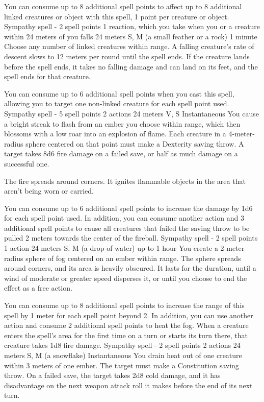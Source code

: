     You can consume up to 8 additional spell points to affect up to 8 additional linked creatures or object with this spell, 1 point per creature or object.
    {Sympathy spell - 2 spell points}
    {1 reaction, which you take when you or a creature within 24 meters of you falls}
    {24 meters}
    {S, M (a small feather or a rock)}
    {1 minute}
    Choose any number of linked creatures within range.
    A falling creature's rate of descent slows to 12 meters per round until the spell ends.
    If the creature lands before the spell ends, it takes no falling damage and can land on its feet, and the spell ends for that creature.

    You can consume up to 6 additional spell points when you cast this spell, allowing you to target one non-linked creature for each spell point used.
    {Sympathy spell - 5 spell points}
    {2 actions}
    {24 meters}
    {V, S}
    {Instantaneous}
    You cause a bright streak to flash from an ember you choose within range, which then blossoms with a low roar into an explosion of flame.
    Each creature in a 4-meter-radius sphere centered on that point must make a Dexterity saving throw.
    A target takes 8d6 fire damage on a failed save, or half as much damage on a successful one.

    The fire spreads around corners.
    It ignites flammable objects in the area that aren't being worn or carried.

    You can consume up to 6 additional spell points to increase the damage by 1d6 for each spell point used.
    In addition, you can consume another action and 3 additional spell points to cause all creatures that failed the saving throw to be pulled 2 meters towards the center of the fireball.
    {Sympathy spell - 2 spell points}
    {1 action}
    {24 meters}
    {S, M (a drop of water)}
    {up to 1 hour}
    You create a 2-meter-radius sphere of fog centered on an ember within range.
    The sphere spreads around corners, and its area is heavily obscured.
    It lasts for the duration, until a wind of moderate or greater speed disperses it, or until you choose to end the effect as a free action.

    You can consume up to 8 additional spell points to increase the range of this spell by 1 meter for each spell point beyond 2.
    In addition, you can use another action and consume 2 additional spell points to heat the fog.
    When a creature enters the spell's area for the first time on a turn or starts its turn there, that creature takes 1d8 fire damage.
    {Sympathy spell - 2 spell points}
    {2 actions}
    {24 meters}
    {S, M (a snowflake)}
    {Instantaneous}
    You drain heat out of one creature within 3 meters of one ember.
    The target must make a Constitution saving throw.
    On a failed save, the target takes 2d8 cold damage, and it has disadvantage on the next weapon attack roll it makes before the end of its next turn.

